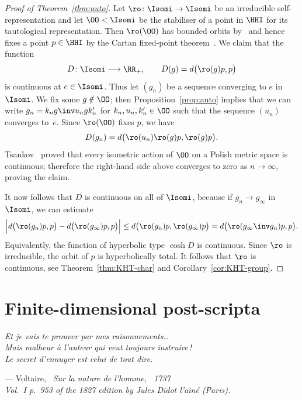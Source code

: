 \begin{proof}[Proof of Theorem~\ref{thm:auto}]
Let $\ro\colon\Isomi\to\Isomi$ be an irreducible self-rep\-re\-sen\-ta\-tion and let $\OO<\Isomi$ be the stabiliser of a point in $\HHI$ for its tautological representation. Then $\ro(\OO)$ has bounded orbits by~\cite[p.~190]{Ricard-Rosendal} and hence fixes a point $p\in\HHI$ by the Cartan fixed-point theorem~\cite[II.2.8]{Bridson-Haefliger}. We claim that the function
\[
D\colon \Isomi \longrightarrow \RR_+, \qquad D(g) = d\big(\ro(g) p, p\big)
\]
is continuous at $e\in\Isomi$. Thus let $(g_n)$ be a sequence converging to $e$ in $\Isomi$. We fix some $g\notin\OO$; then Proposition~\ref{prop:auto} implies that we can write $g_n = k_n g\inv u_n g k'_n$ for $k_n, u_n, k'_n\in\OO$ such that the sequence $(u_n)$ converges to~$e$. Since $\ro(\OO)$ fixes $p$, we have
\[
D(g_n) = d\big(\ro(u_n)\ro(g)p, \ro(g)p\big).
\]
Tsankov~\cite{Tsankov13} proved that every isometric action of $\OO$ on a Polish metric space is continuous; therefore the right-hand side above converges to zero as $n\to\infty$, proving the claim.

It now follows that $D$ is continuous on all of $\Isomi$, because if $g_n\to g_\infty$ in $\Isomi$, we can estimate
\[
\Big| d\big(\ro(g_n) p, p\big) - d\big(\ro(g_\infty) p, p\big) \Big| \leq d\big(\ro(g_n) p, \ro(g_\infty) p\big) = d\big(\ro(g_\infty\inv g_n) p, p\big).
\]
Equivalently, the function of hyperbolic type $\cosh D$ is continuous. Since $\ro$ is irreducible, the orbit of $p$ is hyperbolically total. It follows that $\ro$ is continuous, see Theorem~\ref{thm:KHT-char} and Corollary~\ref{cor:KHT-group}.
\end{proof}

\section{Finite-dimensional post-scripta}\label{sec:PS}

\begin{flushright}
\begin{minipage}[t]{\linewidth}\itshape\small
Et je vais te prouver par mes raisonnements\ldots\\
Mais malheur \`a l'auteur qui veut toujours instruire\,!\\
Le secret d'ennuyer est celui de tout dire.
\begin{flushright}
\upshape\small --- Voltaire, \itshape\ Sur la nature de l'homme, \upshape\ 1737\\ Vol.~I p.~953 of the 1827 edition by Jules Didot l'a\^{\i}n\'e (Paris).
\end{flushright}
\end{minipage}
\end{flushright}
\bigskip

